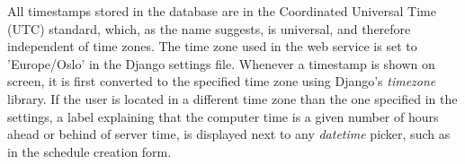 All timestamps stored in the database are in the Coordinated Universal Time (UTC) standard, which, as the name suggests, is universal, and therefore independent of time zones. The time zone used in the web service is set to 'Europe/Oslo' in the Django settings file. Whenever a timestamp is shown on screen, it is first converted to the specified time zone using Django's \emph{timezone} library. If the user is located in a different time zone than the one specified in the settings, a label explaining that the computer time is a given number of hours ahead or behind of server time, is displayed next to any \emph{datetime} picker, such as in the schedule creation form.


